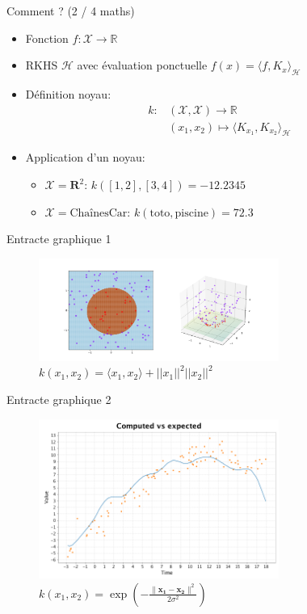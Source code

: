 \documentclass{beamer}
\begin{document}
\begin{frame}{Comment ? (2 / 4 maths)}
	\begin{itemize}
		\item Fonction $f: \mathcal{X} \rightarrow \mathbb{R}$
		\item RKHS $\mathcal{H}$ avec évaluation ponctuelle $f(x) = \langle f, K_x \rangle_\mathcal{H}$
		\item Définition noyau:
		\begin{align*}
			k: & (\mathcal{X}, \mathcal{X}) \rightarrow \mathbb{R} \\
			& (x_1, x_2) \mapsto \langle K_{x_1}, K_{x_2}\rangle_\mathcal{H}
		\end{align*}
		\item Application d'un noyau:
		\begin{itemize}
			\item $\mathcal{X} = \mathbf{R}^2$: $k([1, 2], [3, 4]) = -12.2345$
			\item $\mathcal{X} = \text{ChaînesCar}$: $k(\text{toto}, \text{piscine}) = 72.3$
		\end{itemize}
	\end{itemize}
\end{frame}

\begin{frame}{Entracte graphique 1}
	\begin{figure}[b]
		\includegraphics[width=0.7\textwidth]{figures/KernelTrick}
		\caption{$k(x_1, x_2) = \langle x_1, x_2 \rangle + ||x_1||^2 ||x_2||^2$}
	\end{figure}
\end{frame}

\begin{frame}{Entracte graphique 2}
\begin{figure}[b]
	\includegraphics[width=0.7\textwidth]{figures/regression}
	\caption{$k(x_1, x_2)=\exp\left(- \frac{\|\mathbf{x_1} - \mathbf{x_2}\|^2}{2 \sigma^2}\right)$}
\end{figure}
\end{frame}
\end{document}

